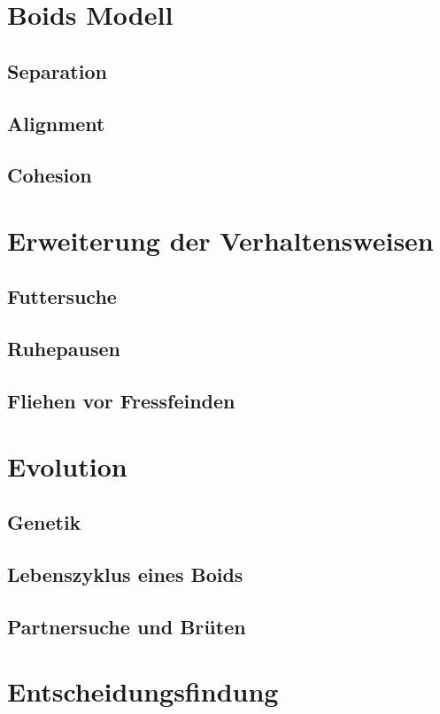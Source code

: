 \documentclass[draft=false
              ,paper=a4
              ,twoside=false
              ,fontsize=11pt
              ,headsepline
              ,BCOR10mm
              ,DIV11
              ,bibtotoc
              ,liststotoc
              ]{scrbook}
\begin{document}
\section{Boids Modell}
\subsection{Separation}
\subsection{Alignment}
\subsection{Cohesion}

\section{Erweiterung der Verhaltensweisen}
\subsection{Futtersuche}
\subsection{Ruhepausen}
\subsection{Fliehen vor Fressfeinden}

\section{Evolution}
\subsection{Genetik}
\subsection{Lebenszyklus eines Boids}
\subsection{Partnersuche und Brüten}

\section{Entscheidungsfindung}
\end{document}
